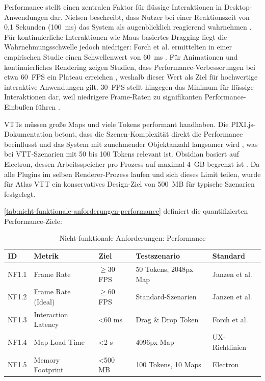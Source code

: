 Performance stellt einen zentralen Faktor für flüssige Interaktionen in Desktop-Anwendungen dar. Nielsen beschreibt, dass Nutzer bei einer Reaktionszeit von 0,1 Sekunden (100~\ac{ms}) das System als augenblicklich reagierend wahrnehmen \autocite{Nielsen1993ResponseTimes}. Für kontinuierliche Interaktionen wie Maus-basiertes Dragging liegt die Wahrnehmungsschwelle jedoch niedriger: Forch et al. ermittelten in einer empirischen Studie einen Schwellenwert von 60~\ac{ms} \autocite[S. 53]{Forch2017LatencyPerception}. Für Animationen und kontinuierliches Rendering zeigen Studien, dass Performance-Verbesserungen bei etwa 60~\ac{FPS} ein Plateau erreichen \autocite[S. 1480]{Janzen2014FrameRate}, weshalb dieser Wert als Ziel für hochwertige interaktive Anwendungen gilt. 30~\ac{FPS} stellt hingegen das Minimum für flüssige Interaktionen dar, weil niedrigere Frame-Raten zu signifikanten Performance-Einbußen führen \autocite[S. 1480]{Janzen2014FrameRate}.

\ac{VTT}s müssen große Maps und viele Tokens performant handhaben. Die PIXI.js-Dokumentation betont, dass die Szenen-Komplexität direkt die Performance beeinflusst und das System mit zunehmender Objektanzahl langsamer wird \autocite{PixiPerf2024}, was bei \ac{VTT}-Szenarien mit 50 bis 100 Tokens relevant ist. Obsidian basiert auf Electron, dessen Arbeitsspeicher pro Prozess auf maximal 4~GB begrenzt ist \autocite{ElectronV8MemoryCage2022}. Da alle Plugins im selben Renderer-Prozess laufen und sich dieses Limit teilen, wurde für Atlas \ac{VTT} ein konservatives Design-Ziel von 500~\ac{MB} für typische Szenarien festgelegt.

\autoref{tab:nicht-funktionale-anforderungen-performance} definiert die quantifizierten Performance-Ziele:

\begin{table}[htbp]
	\centering
	\small
	\caption{Nicht-funktionale Anforderungen: Performance}
	\label{tab:nicht-funktionale-anforderungen-performance}
	\begin{tabularx}{\textwidth}{lXlXl}
		\toprule
		\textbf{ID} & \textbf{Metrik}     & \textbf{Ziel}     & \textbf{Testszenario} & \textbf{Standard}                                        \\
		\midrule
		NF1.1       & Frame Rate          & $\geq$30 \ac{FPS} & 50 Tokens, 2048px Map & Janzen et al.\autocite[S. 1480]{Janzen2014FrameRate}     \\
		NF1.2       & Frame Rate (Ideal)  & $\geq$60 \ac{FPS} & Standard-Szenarien    & Janzen et al.\autocite[S. 1480]{Janzen2014FrameRate}     \\
		NF1.3       & Interaction Latency & <60 \ac{ms}       & Drag \& Drop Token    & Forch et al.\autocite[S. 53]{Forch2017LatencyPerception} \\
		NF1.4       & Map Load Time       & <2 s              & 4096px Map            & UX-Richtlinien                                           \\
		NF1.5       & Memory Footprint    & <500 \ac{MB}      & 100 Tokens, 10 Maps   & Electron                                                 \\
		\bottomrule
	\end{tabularx}
\end{table}

